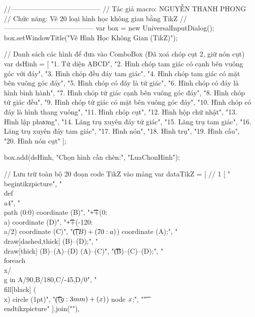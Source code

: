 //---------------------------------------
// Tác giả macro: NGUYỄN THANH PHONG
// Chức năng: Vẽ 20 loại hình học không gian bằng TikZ
//---------------------------------------
var box = new UniversalInputDialog();
box.setWindowTitle("Vẽ Hình Học Không Gian (TikZ)");

// Danh sách các hình để đưa vào ComboBox (Đã xoá chóp cụt 2, giữ nón cụt)
var dsHinh = [
"1. Tứ diện ABCD",
"2. Hình chóp tam giác có cạnh bên vuông góc với đáy",
"3. Hình chóp đều đáy tam giác",
"4. Hình chóp tam giác có mặt bên vuông góc đáy",
"5. Hình chóp có đáy là tứ giác",
"6. Hình chóp có đáy là hình bình hành",
"7. Hình chóp tứ giác cạnh bên vuông góc đáy",
"8. Hình chóp tứ giác đều",
"9. Hình chóp tứ giác có mặt bên vuông góc đáy",
"10. Hình chóp có đáy là hình thang vuông",
"11. Hình chóp cụt",
"12. Hình hộp chữ nhật",
"13. Hình lập phương",
"14. Lăng trụ xuyên đáy tứ giác",
"15. Lăng trụ tam giác",
"16. Lăng trụ xuyên đáy tam giác",
"17. Hình nón",
"18. Hình trụ",
"19. Hình cầu",
"20. Hình nón cụt"
];

box.add(dsHinh, "Chọn hình cần chèn:", "LuaChonHinh");

// Lưu trữ toàn bộ 20 đoạn code TikZ vào mảng
var dataTikZ = [
// 1
[
"\\begin{tikzpicture}",
"\t\\def\\a{4}",
"\t\\path         (0:0) coordinate (B)",
"\t\t\t++(0:\\a) coordinate (D)",
"\t\t\t++(-120:\\a/2) coordinate (C)",
"\t\t\t($(B)+(70:\\a)$) coordinate (A);",
"\t\\draw[dashed,thick]         (B)--(D);",
"\t\\draw[thick]                         (B)--(A)--(D) (A)--(C)",
"\t\t\t\t\t(B)--(C)--(D);",
"\t\\foreach \\x/\\g in {A/90,B/180,C/-45,D/0}",
"\t\t\t\\fill[black]         (\\x) circle (1pt)",
"\t\t\t($(\\g:3mm)+(\\x)$) node {$\\x$};",
"\t%
"\\end{tikzpicture}"
].join("\n"),


